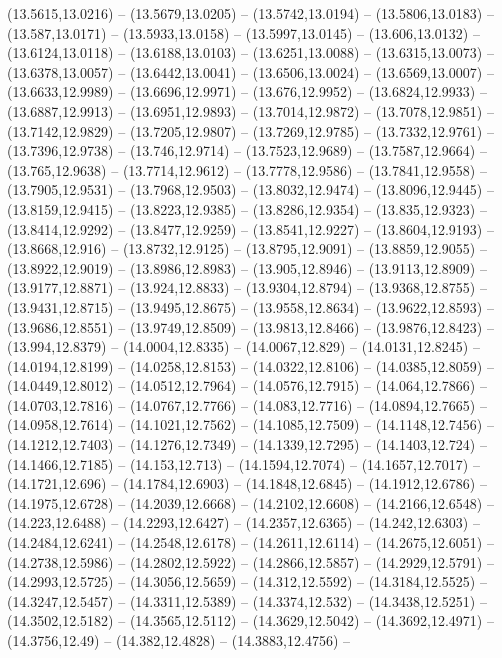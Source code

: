 {(13.5615,13.0216) -- (13.5679,13.0205) -- (13.5742,13.0194) -- (13.5806,13.0183) -- (13.587,13.0171) -- (13.5933,13.0158) -- (13.5997,13.0145) -- (13.606,13.0132) -- (13.6124,13.0118) -- (13.6188,13.0103) -- (13.6251,13.0088) -- (13.6315,13.0073) --
(13.6378,13.0057) -- (13.6442,13.0041) -- (13.6506,13.0024) -- (13.6569,13.0007) -- (13.6633,12.9989) -- (13.6696,12.9971) -- (13.676,12.9952) -- (13.6824,12.9933) -- (13.6887,12.9913) -- (13.6951,12.9893) -- (13.7014,12.9872) -- (13.7078,12.9851)
-- (13.7142,12.9829) -- (13.7205,12.9807) -- (13.7269,12.9785) -- (13.7332,12.9761) -- (13.7396,12.9738) -- (13.746,12.9714) -- (13.7523,12.9689) -- (13.7587,12.9664) -- (13.765,12.9638) -- (13.7714,12.9612) -- (13.7778,12.9586) -- (13.7841,12.9558)
-- (13.7905,12.9531) -- (13.7968,12.9503) -- (13.8032,12.9474) -- (13.8096,12.9445) -- (13.8159,12.9415) -- (13.8223,12.9385) -- (13.8286,12.9354) -- (13.835,12.9323) -- (13.8414,12.9292) -- (13.8477,12.9259) -- (13.8541,12.9227) --
(13.8604,12.9193) -- (13.8668,12.916) -- (13.8732,12.9125) -- (13.8795,12.9091) -- (13.8859,12.9055) -- (13.8922,12.9019) -- (13.8986,12.8983) -- (13.905,12.8946) -- (13.9113,12.8909) -- (13.9177,12.8871) -- (13.924,12.8833) -- (13.9304,12.8794) --
(13.9368,12.8755) -- (13.9431,12.8715) -- (13.9495,12.8675) -- (13.9558,12.8634) -- (13.9622,12.8593) -- (13.9686,12.8551) -- (13.9749,12.8509) -- (13.9813,12.8466) -- (13.9876,12.8423) -- (13.994,12.8379) -- (14.0004,12.8335) -- (14.0067,12.829) --
(14.0131,12.8245) -- (14.0194,12.8199) -- (14.0258,12.8153) -- (14.0322,12.8106) -- (14.0385,12.8059) -- (14.0449,12.8012) -- (14.0512,12.7964) -- (14.0576,12.7915) -- (14.064,12.7866) -- (14.0703,12.7816) -- (14.0767,12.7766) -- (14.083,12.7716) --
(14.0894,12.7665) -- (14.0958,12.7614) -- (14.1021,12.7562) -- (14.1085,12.7509) -- (14.1148,12.7456) -- (14.1212,12.7403) -- (14.1276,12.7349) -- (14.1339,12.7295) -- (14.1403,12.724) -- (14.1466,12.7185) -- (14.153,12.713) -- (14.1594,12.7074) --
(14.1657,12.7017) -- (14.1721,12.696) -- (14.1784,12.6903) -- (14.1848,12.6845) -- (14.1912,12.6786) -- (14.1975,12.6728) -- (14.2039,12.6668) -- (14.2102,12.6608) -- (14.2166,12.6548) -- (14.223,12.6488) -- (14.2293,12.6427) -- (14.2357,12.6365) --
(14.242,12.6303) -- (14.2484,12.6241) -- (14.2548,12.6178) -- (14.2611,12.6114) -- (14.2675,12.6051) -- (14.2738,12.5986) -- (14.2802,12.5922) -- (14.2866,12.5857) -- (14.2929,12.5791) -- (14.2993,12.5725) -- (14.3056,12.5659) -- (14.312,12.5592) --
(14.3184,12.5525) -- (14.3247,12.5457) -- (14.3311,12.5389) -- (14.3374,12.532) -- (14.3438,12.5251) -- (14.3502,12.5182) -- (14.3565,12.5112) -- (14.3629,12.5042) -- (14.3692,12.4971) -- (14.3756,12.49) -- (14.382,12.4828) -- (14.3883,12.4756) --
}
